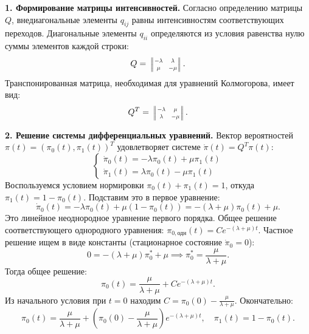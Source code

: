 \begin{eproof}
    \textbf{1. Формирование матрицы интенсивностей.}
    Согласно определению матрицы $Q$, внедиагональные элементы $q_{ij}$ равны интенсивностям соответствующих переходов. Диагональные элементы $q_{ii}$ определяются из условия равенства нулю суммы элементов каждой строки:
    \begin{equation}
        Q = \mat{-\lambda & \lambda \\ \mu & -\mu}.
    \end{equation}
    Транспонированная матрица, необходимая для уравнений Колмогорова, имеет вид:
    \begin{equation}
        Q^T = \mat{-\lambda & \mu \\ \lambda & -\mu}.
    \end{equation}

    \textbf{2. Решение системы дифференциальных уравнений.}
    Вектор вероятностей $\pi(t) = (\pi_0(t), \pi_1(t))^T$ удовлетворяет системе $\dot{\pi}(t) = Q^T \pi(t)$:
    \begin{equation}
        \begin{cases} 
            \dot{\pi}_0(t) = -\lambda \pi_0(t) + \mu \pi_1(t) \\ 
            \dot{\pi}_1(t) = \lambda \pi_0(t) - \mu \pi_1(t) 
        \end{cases}
    \end{equation}
    Воспользуемся условием нормировки $\pi_0(t) + \pi_1(t) = 1$, откуда $\pi_1(t) = 1 - \pi_0(t)$. Подставим это в первое уравнение:
    \begin{equation}
        \dot{\pi}_0(t) = -\lambda \pi_0(t) + \mu (1 - \pi_0(t)) = -(\lambda + \mu)\pi_0(t) + \mu.
    \end{equation}
    Это линейное неоднородное уравнение первого порядка. Общее решение соответствующего однородного уравнения: $\pi_{0, \text{одн}}(t) = C e^{-(\lambda + \mu)t}$. Частное решение ищем в виде константы (стационарное состояние $\dot{\pi}_0 = 0$):
    \begin{equation}
        0 = -(\lambda + \mu)\pi_0^* + \mu \implies \pi_0^* = \frac{\mu}{\lambda + \mu}.
    \end{equation}
    Тогда общее решение:
    \begin{equation}
        \pi_0(t) = \frac{\mu}{\lambda + \mu} + C e^{-(\lambda + \mu)t}.
    \end{equation}
    Из начального условия при $t=0$ находим $C = \pi_0(0) - \frac{\mu}{\lambda + \mu}$. Окончательно:
    \begin{equation}
        \pi_0(t) = \frac{\mu}{\lambda + \mu} + \left( \pi_0(0) - \frac{\mu}{\lambda + \mu} \right) e^{-(\lambda + \mu)t}, \quad \pi_1(t) = 1 - \pi_0(t).
    \end{equation}


\end{eproof}
